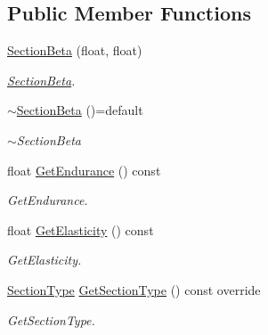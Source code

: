 \subsection*{Public Member Functions}
\begin{DoxyCompactItemize}
\item 
\hyperlink{classdata__model_1_1_section_beta_a8a7b7a25235b6b74e0af3c0857581fb8}{Section\+Beta} (float, float)\hypertarget{classdata__model_1_1_section_beta_a8a7b7a25235b6b74e0af3c0857581fb8}{}\label{classdata__model_1_1_section_beta_a8a7b7a25235b6b74e0af3c0857581fb8}

\begin{DoxyCompactList}\small\item\em \hyperlink{classdata__model_1_1_section_beta}{Section\+Beta}. \end{DoxyCompactList}\item 
\hyperlink{classdata__model_1_1_section_beta_ad06c9ba3d8486a04d8ce3c0d334a2fa4}{$\sim$\+Section\+Beta} ()=default\hypertarget{classdata__model_1_1_section_beta_ad06c9ba3d8486a04d8ce3c0d334a2fa4}{}\label{classdata__model_1_1_section_beta_ad06c9ba3d8486a04d8ce3c0d334a2fa4}

\begin{DoxyCompactList}\small\item\em $\sim$\+Section\+Beta \end{DoxyCompactList}\item 
float \hyperlink{classdata__model_1_1_section_beta_aa21981823334ed9e50eee0fc95dfa4c7}{Get\+Endurance} () const 
\begin{DoxyCompactList}\small\item\em Get\+Endurance. \end{DoxyCompactList}\item 
float \hyperlink{classdata__model_1_1_section_beta_a0ceb4a4bf82c216bea9d021b7e8b8481}{Get\+Elasticity} () const 
\begin{DoxyCompactList}\small\item\em Get\+Elasticity. \end{DoxyCompactList}\item 
\hyperlink{classdata__model_1_1_section_acba8f1759f6c20b81bed2d4a1178a155}{Section\+Type} \hyperlink{classdata__model_1_1_section_beta_a2eb6a17542583ac5d3b1b600cd56a1da}{Get\+Section\+Type} () const override
\begin{DoxyCompactList}\small\item\em Get\+Section\+Type. \end{DoxyCompactList}\end{DoxyCompactItemize}
